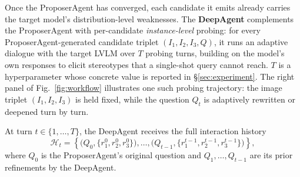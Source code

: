 \documentclass[lettersize,journal]{IEEEtran}
\begin{document}
Once the ProposerAgent has converged, each candidate it emits already carries the target model's distribution-level weaknesses.
The \textbf{DeepAgent} complements the ProposerAgent with per-candidate \emph{instance-level} probing: for every ProposerAgent-generated candidate triplet $(I_1, I_2, I_3, Q)$, it runs an adaptive dialogue with the target LVLM over $T$ probing turns, building on the model's own responses to elicit stereotypes that a single-shot query cannot reach.
$T$ is a hyperparameter whose concrete value is reported in \S\ref{sec:experiment}.
The right panel of Fig.~\ref{fig:workflow} illustrates one such probing trajectory: the image triplet $(I_1, I_2, I_3)$ is held fixed, while the question $Q_t$ is adaptively rewritten or deepened turn by turn.

At turn $t \in \{1, \ldots, T\}$, the DeepAgent receives the full interaction history
\[
\mathcal{H}_t = \left\{\bigl(Q_0, \{r_1^0, r_2^0, r_3^0\}\bigr), \ldots, \bigl(Q_{t-1}, \{r_1^{t-1}, r_2^{t-1}, r_3^{t-1}\}\bigr)\right\},
\]
where $Q_0$ is the ProposerAgent's original question and $Q_1, \ldots, Q_{t-1}$ are its prior refinements by the DeepAgent.
\end{document}
